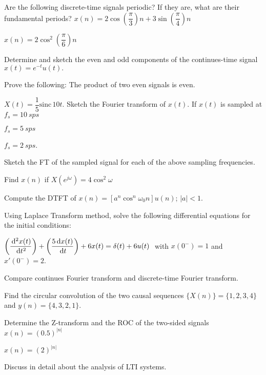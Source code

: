 \markB
\partC

\item \iitem Are the following discrete-time signals periodic? If they are,
  what are their fundamental periods?
\iitem $x(n) = 2\cos \left(\dfrac{\pi}{3}\right)n + 3 \sin
  \left(\dfrac{\pi}{4}\right)n$

\newpage \again

\item $x(n) = 2\cos^2 \left(\dfrac{\pi}{6}\right)n $
\ene
\Or
\item \iitem Determine and sketch the even and odd components of the continues-time
  signal $x(t)=e^{-t}u(t).$ 
\item Prove the following: The product of two even signals is even.
\ene
\ene

\item \iitem $X(t) = \dfrac{1}{5} \text{sinc}\,10t.$ Sketch the Fourier transform
  of $x(t).$ If $x(t)$ is sampled at
\iitem $f_s = 10\ sps$
\item $f_s = 5\ sps$
\item $f_s = 2\ sps$.

  Sketch the FT of the sampled signal for each of the above sampling frequencies. 
\ene
\Or
\item 
\iitem Find $x(n)$ if $X(e^{j\omega}) = 4 \cos^2 \omega$
\item Compute the DTFT of $x(n) = [a^n \cos^n \omega_0n]u(n)$; $|a| < 1$.
\ene
\ene

\item \iitem Using Laplace Transform method, solve the following differential
  equations for the initial conditions:

  $\left(\dfrac{\,\mathrm{d}^2x(t)}{\,\mathrm{d} t^2}\right) + \left( \dfrac{5 \,\mathrm{d} x(t)}{\,\mathrm{d} t}\right) +
  6x(t) = \delta (t) + 6 u(t)\;$ 
  with $x(0^-) = 1$ and $x'(0^-) = 2$.
\Or
\item \iitem Compare continues Fourier transform and discrete-time Fourier transform.
\item Find the circular convolution of the two causal sequences
  $\{X(n)\} = \{1,2,3,4\}$ and $ y(n) = \{ 4,3,2,1\}$.
\ene \ene

\item \iitem Determine the Z-transform and the ROC of the two-sided signals 
\iitem $x(n) = (0.5)^{|n|}$ \item $x(n) = (2)^{|n|}$
\ene
\Or
\item Discuss in detail about the analysis of LTI systems. 
\ene

\markC
\ene

